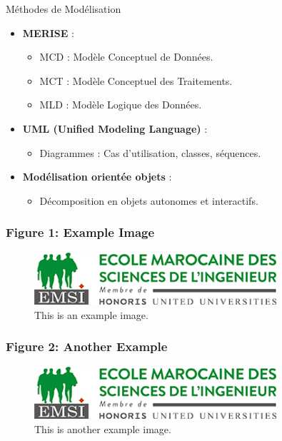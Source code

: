 \documentclass{beamer}
\begin{document}
\begin{frame}{Méthodes de Modélisation}
    \begin{itemize}
        \item \textbf{MERISE} :
        \begin{itemize}
            \item MCD : Modèle Conceptuel de Données.
            \item MCT : Modèle Conceptuel des Traitements.
            \item MLD : Modèle Logique des Données.
        \end{itemize}
        \item \textbf{UML (Unified Modeling Language)} :
        \begin{itemize}
            \item Diagrammes : Cas d'utilisation, classes, séquences.
        \end{itemize}
        \item \textbf{Modélisation orientée objets} :
        \begin{itemize}
            \item Décomposition en objets autonomes et interactifs.
        \end{itemize}
    \end{itemize}
\end{frame}

\begin{frame}
    \frametitle{Figure 1: Example Image}
    \label{fig1}
    \begin{figure}
        \includegraphics[width=0.8\textwidth]{logo}
        \caption{This is an example image.}
    \end{figure}
\end{frame}

\begin{frame}
    \frametitle{Figure 2: Another Example}
    \label{fig2}
    \begin{figure}
        \includegraphics[width=0.8\textwidth]{logo}
        \caption{This is another example image.}
    \end{figure}
\end{frame}
\end{document}
